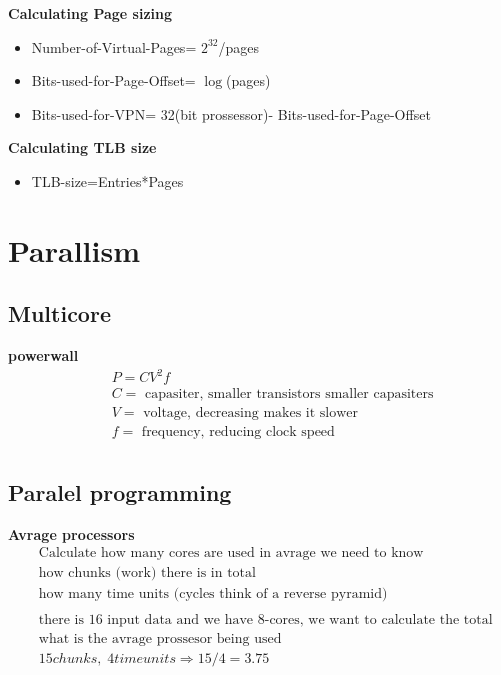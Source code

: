 \textbf{Calculating Page sizing}
\begin{itemize}
\item  Number-of-Virtual-Pages= $2^{32}$/pages
\item  Bits-used-for-Page-Offset= $\log$(pages)
\item  Bits-used-for-VPN= 32(bit prossessor)- Bits-used-for-Page-Offset
\end{itemize}

\textbf{Calculating TLB size}
\begin{itemize}
\item  TLB-size=Entries*Pages
\end{itemize}



\section{Parallism}

\subsection{Multicore}
\textbf{powerwall}
\begin{align*}
  &\quad P=CV^2f \\
  &\quad C= \text{ capasiter, smaller transistors smaller capasiters} \\
  &\quad V= \text{ voltage, decreasing makes it slower} \\
  &\quad f= \text{ frequency, reducing clock speed} \\
\end{align*}

\subsection{Paralel programming}


\textbf{Avrage processors}
\begin{align*}
  &\quad  \text{Calculate how many cores are used in avrage we need to know } \\
  &\quad  \text{how chunks (work) there is in total } \\
  &\quad  \text{how many time units (cycles think of a reverse pyramid)} \\
  &\quad  \\
  &\quad  \text{there is 16 input data and we have 8-cores, we want to calculate the total sum} \\
  &\quad  \text{what is the avrage prossesor being used} \\
  &\quad  15 chunks, \; 4 time units \Rightarrow 15/4 = 3.75 \\
\end{align*}

